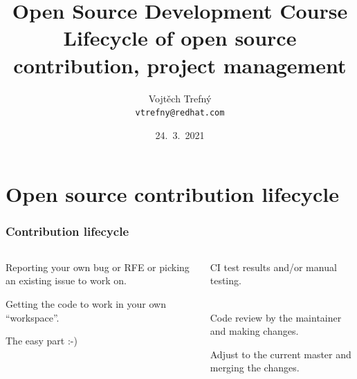 \documentclass[aspectratio=169]{beamer}              %
\title[Open Source Development Course]{Open Source Development Course\\ \small Lifecycle of open source contribution, project management}
\author{Vojtěch Trefný\\ \small \texttt{vtrefny@redhat.com}\\}
\date{24.~3.~2021}
\institute{\faTwitter\, \href{https://twitter.com/vojtechtrefny}{twitter.com/vojtechtrefny} \\ \faGithub\, \href{https://github.com/vojtechtrefny}{github.com/vojtechtrefny} \\ \faGitlab\ \href{https://gitlab.com/vtrefny}{gitlab.com/vtrefny}}
\begin{document}
{ 
\begin{frame}
\titlepage
\end{frame}
}

\newcommand*\openquote{\makebox(25,-22){\scalebox{5}{``}}}
\newcommand*\closequote{\makebox(25,-22){\scalebox{5}{''}}}


\section{Open source contribution lifecycle}

\begin{frame}
	\frametitle{Contribution lifecycle}
	
\begin{columns}
\begin{column}{0.5\textwidth}
   	\begin{block}{\color{orange}{1. Issue}}
   		\vspace{1mm}
Reporting your own bug or RFE or picking an existing issue to work on.
	\end{block}
	\begin{block}{\color{orange}{2. Fork}}
   		\vspace{1mm}
Getting the code to work in your own ``workspace''.
     \end{block}
         \begin{block}{\color{orange}{3. Development}}
   		\vspace{1mm}
The easy part :-)\\~
     \end{block}
     
\end{column}
\begin{column}{0.5\textwidth} 
\begin{block}{\color{orange}{4. Tests}}
   		\vspace{1mm}
CI test results and/or manual testing.\\~
     \end{block}
      \begin{block}{\color{orange}{5. Code review}}
   		\vspace{1mm}
Code review by the maintainer and making changes.
     \end{block}
      \begin{block}{\color{orange}{6. Rebase \& merge}}
   		\vspace{1mm}
Adjust to the current master and merging the changes.
     \end{block}
\end{column}
\end{columns}
\end{frame}
\end{document}

